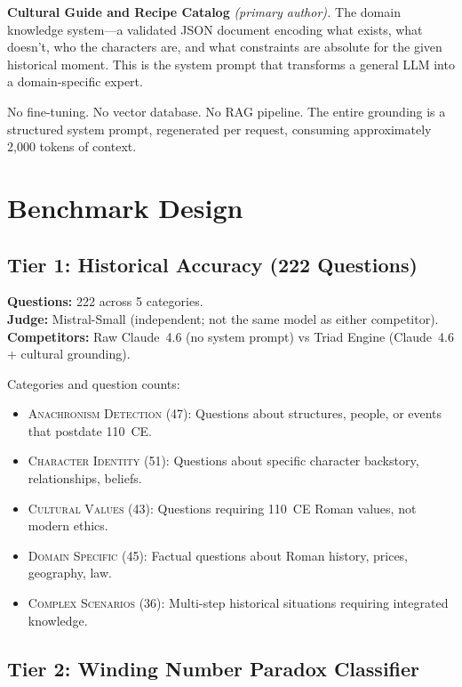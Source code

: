\documentclass[11pt,a4paper]{article}
\begin{document}
\medskip
\textbf{Cultural Guide and Recipe Catalog} \textit{(primary author).}
The domain knowledge system---a validated JSON document encoding what exists,
what doesn't, who the characters are, and what constraints are absolute for
the given historical moment. This is the system prompt that transforms a
general LLM into a domain-specific expert.

\medskip
No fine-tuning. No vector database. No RAG pipeline. The entire grounding is
a structured system prompt, regenerated per request, consuming approximately
2,000 tokens of context.

\section{Benchmark Design}

\subsection{Tier 1: Historical Accuracy (222 Questions)}

\textbf{Questions:} 222 across 5 categories.\\
\textbf{Judge:} Mistral-Small (independent; not the same model as either
competitor).\\
\textbf{Competitors:} Raw Claude~4.6 (no system prompt) vs Triad Engine
(Claude~4.6 + cultural grounding).

\smallskip
Categories and question counts:
\begin{itemize}
  \item \textsc{Anachronism Detection} (47): Questions about structures,
        people, or events that postdate 110~CE.
  \item \textsc{Character Identity} (51): Questions about specific character
        backstory, relationships, beliefs.
  \item \textsc{Cultural Values} (43): Questions requiring 110~CE Roman
        values, not modern ethics.
  \item \textsc{Domain Specific} (45): Factual questions about Roman history,
        prices, geography, law.
  \item \textsc{Complex Scenarios} (36): Multi-step historical situations
        requiring integrated knowledge.
\end{itemize}

\subsection{Tier 2: Winding Number Paradox Classifier}
\end{document}
